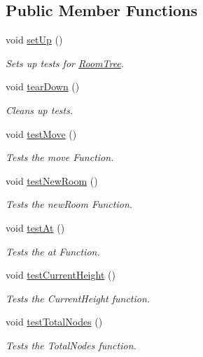 \subsection*{Public Member Functions}
\begin{DoxyCompactItemize}
\item 
void \hyperlink{classRoomTreeTest_ae70ed88d72b79d6615705caf5a635aca}{set\-Up} ()
\begin{DoxyCompactList}\small\item\em Sets up tests for \hyperlink{classRoomTree}{Room\-Tree}. \end{DoxyCompactList}\item 
void \hyperlink{classRoomTreeTest_afa7584edb8a8267c922160e4d7c9d037}{tear\-Down} ()
\begin{DoxyCompactList}\small\item\em Cleans up tests. \end{DoxyCompactList}\item 
void \hyperlink{classRoomTreeTest_aab3dedfa3aaa0bfab811a8d0d8c8b7e0}{test\-Move} ()
\begin{DoxyCompactList}\small\item\em Tests the move Function. \end{DoxyCompactList}\item 
void \hyperlink{classRoomTreeTest_a1f342a990eb4b60cfae96dac1dbbedee}{test\-New\-Room} ()
\begin{DoxyCompactList}\small\item\em Tests the new\-Room Function. \end{DoxyCompactList}\item 
void \hyperlink{classRoomTreeTest_a7999cf9d9149ade6f39fbb7be601805e}{test\-At} ()
\begin{DoxyCompactList}\small\item\em Tests the at Function. \end{DoxyCompactList}\item 
void \hyperlink{classRoomTreeTest_a67dd37f922aabba4fefe925cfbd8483a}{test\-Current\-Height} ()
\begin{DoxyCompactList}\small\item\em Tests the Current\-Height function. \end{DoxyCompactList}\item 
void \hyperlink{classRoomTreeTest_a59d8363440d55c68ef79109efe88a5f5}{test\-Total\-Nodes} ()
\begin{DoxyCompactList}\small\item\em Tests the Total\-Nodes function. \end{DoxyCompactList}\end{DoxyCompactItemize}
